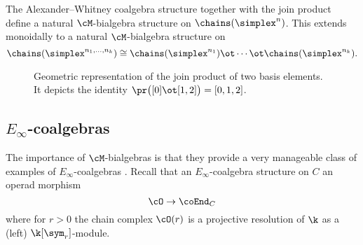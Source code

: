 The Alexander--Whitney coalgebra structure together with the join product define a natural $\cM$-bialgebra structure on $\chains(\simplex^n)$. This extends monoidally to a natural $\cM$-bialgebra structure on
\[
\chains(\simplex^{n_1, \dots, n_k}) \cong
\chains(\simplex^{n_1}) \ot \dotsb \ot \chains(\simplex^{n_k}).
\]

\begin{figure}
	
	\caption{Geometric representation of the join product of two basis elements. It depicts the identity $\pr \big( [0] \ot [1,2] \big) = [0,1,2]$.}
	\label{f:join of faces}
\end{figure}

\subsection{\texorpdfstring{${E_\infty}$}{E-infty}-coalgebras}

The importance of $\cM$-bialgebras is that they provide a very manageable class of examples of $E_\infty$-coalgebras \cite{medina2020prop1}.
Recall that an $E_\infty$-coalgebra structure on $C$ an operad morphism
\[
\cO \to \coEnd_C
\]
where for $r > 0$ the chain complex $\cO(r)$ is a projective resolution of $\k$ as a (left) $\k[\sym_r]$-module.